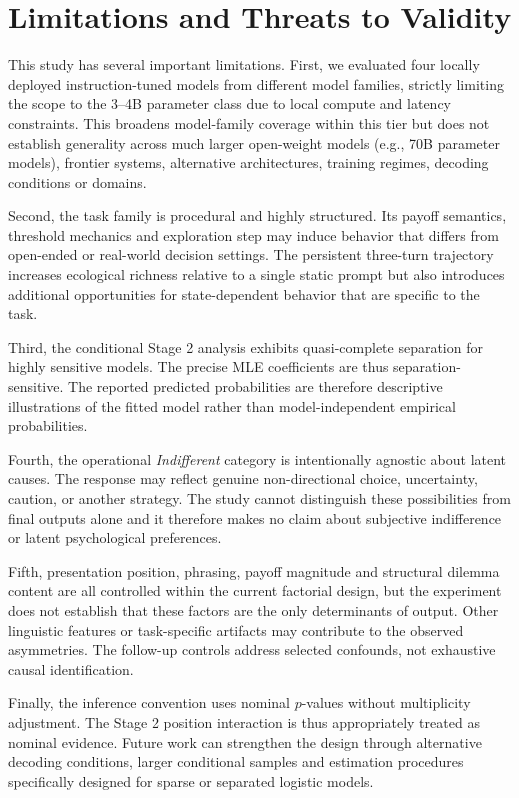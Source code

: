 \documentclass[10pt,journal,compsoc]{IEEEtran}
\begin{document}
\section{Limitations and Threats to Validity}
\label{sec:limitations}

This study has several important limitations. First, we evaluated four locally deployed instruction-tuned models from different model families, strictly limiting the scope to the 3--4B parameter class due to local compute and latency constraints. This broadens model-family coverage within this tier but does not establish generality across much larger open-weight models (e.g., 70B parameter models), frontier systems, alternative architectures, training regimes, decoding conditions or domains.

Second, the task family is procedural and highly structured. Its payoff semantics, threshold mechanics and exploration step may induce behavior that differs from open-ended or real-world decision settings. The persistent three-turn trajectory increases ecological richness relative to a single static prompt but also introduces additional opportunities for state-dependent behavior that are specific to the task.

Third, the conditional Stage 2 analysis exhibits quasi-complete separation for highly sensitive models. The precise MLE coefficients are thus separation-sensitive. The reported predicted probabilities are therefore descriptive illustrations of the fitted model rather than model-independent empirical probabilities.

Fourth, the operational \textit{Indifferent} category is intentionally agnostic about latent causes. The response may reflect genuine non-directional choice, uncertainty, caution, or another strategy. The study cannot distinguish these possibilities from final outputs alone and it therefore makes no claim about subjective indifference or latent psychological preferences.

Fifth, presentation position, phrasing, payoff magnitude and structural dilemma content are all controlled within the current factorial design, but the experiment does not establish that these factors are the only determinants of output. Other linguistic features or task-specific artifacts may contribute to the observed asymmetries. The follow-up controls address selected confounds, not exhaustive causal identification.

Finally, the inference convention uses nominal $p$-values without multiplicity adjustment. The Stage 2 position interaction is thus appropriately treated as nominal evidence. Future work can strengthen the design through alternative decoding conditions, larger conditional samples and estimation procedures specifically designed for sparse or separated logistic models.
\end{document}
